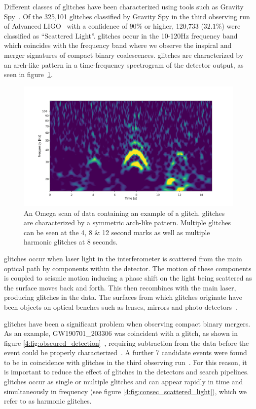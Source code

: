 Different classes of glitches have been characterized using tools such as Gravity Spy~\cite{gravityspy:2017, gravityspy:2023}. Of the 325,101 glitches classified by Gravity Spy in the third observing run of Advanced LIGO~\cite{gravityspy:2021} with a confidence of $90\%$ or higher, 120,733 ($32.1\%$) were classified as ``Scattered Light''. \Scl{} glitches occur in the 10-120Hz frequency band~\cite{reducing_scattering:2020} which coincides with the frequency band where we observe the inspiral and merger signatures of compact binary coalescences. \Scl{} glitches are characterized by an arch-like pattern in a time-frequency spectrogram of the detector output, as seen in figure~\ref{4:fig:scattered_light}. 
%
\begin{figure}
  \includegraphics[width=\textwidth]{images/4_archenemy/Section1/single_stack.pdf}
  \caption{An Omega scan \cite{gwdetchar_tools:2021} of \gw{} data containing an example of a \scl{} glitch. \Scl{} glitches are characterized by a symmetric arch-like pattern. Multiple \scl{} glitches can be seen at the 4, 8 \& 12 second marks as well as multiple harmonic glitches at 8 seconds.}
  \label{4:fig:scattered_light}
\end{figure}
%
\Scl{} glitches occur when laser light in the interferometer is scattered from the main optical path by components within the detector. The motion of these components is coupled to seismic motion inducing a phase shift on the light being scattered as the surface moves back and forth. This \scl{} then recombines with the main laser, producing \scl{} glitches in the data. The surfaces from which \scl{} glitches originate have been objects on optical benches such as lenses, mirrors and photo-detectors~\cite{TAccadia:2010}.

\Scl{} glitches have been a significant problem when observing compact binary mergers. As an example, GW190701\_203306 was coincident with a \scl{} glitch, as shown in figure \ref{4:fig:obscured_detection}~\cite{gwtc2:2021}, requiring subtraction from the data before the event could be properly characterized~\cite{O3_subtraction:2022}. A further 7 candidate events were found to be in coincidence with \scl{} glitches in the third observing run~\cite{gwtc3:2023}. For this reason, it is important to reduce the effect of \scl{} glitches in the detectors and \gw{} search pipelines. \Scl{} glitches occur as single or multiple glitches and can appear rapidly in time and simultaneously in frequency (see figure \ref{4:fig:consec_scattered_light}), which we refer to as harmonic glitches.

